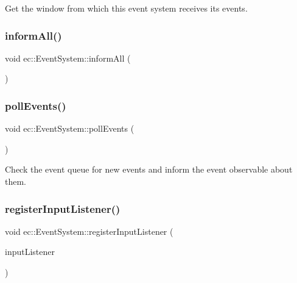 Get the window from which this event system receives its events. \mbox{\label{classec_1_1_event_system_a45e41343c01e736a818c642696140632}} 
\subsubsection{\texorpdfstring{inform\+All()}{informAll()}}
{\footnotesize\ttfamily void ec\+::\+Event\+System\+::inform\+All (\begin{DoxyParamCaption}{ }\end{DoxyParamCaption})}

\mbox{\label{classec_1_1_event_system_a547dbafa5aa6f770c8a839d81a369ea6}} 
\subsubsection{\texorpdfstring{poll\+Events()}{pollEvents()}}
{\footnotesize\ttfamily void ec\+::\+Event\+System\+::poll\+Events (\begin{DoxyParamCaption}{ }\end{DoxyParamCaption})}

Check the event queue for new events and inform the event observable about them. \mbox{\label{classec_1_1_event_system_a179422c96238019204eccd00f8662c01}} 
\subsubsection{\texorpdfstring{register\+Input\+Listener()}{registerInputListener()}}
{\footnotesize\ttfamily void ec\+::\+Event\+System\+::register\+Input\+Listener (\begin{DoxyParamCaption}\item[{\mbox{\hyperlink{classec_1_1_input_listener}{Input\+Listener}} $\ast$}]{input\+Listener }\end{DoxyParamCaption})}

